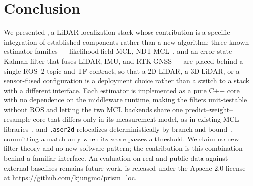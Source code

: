 \section{Conclusion}\label{sec:conclusion}

We presented \prismloc, a LiDAR localization stack whose contribution is
a specific integration of established components rather than a new
algorithm: three known estimator families --- likelihood-field MCL,
NDT-MCL~\cite{saarinen2013ndtmcl}, and an error-state Kalman filter that
fuses LiDAR, IMU, and RTK-GNSS --- are placed behind a single ROS~2
topic and TF contract, so that a 2D LiDAR, a 3D LiDAR, or a
sensor-fused configuration is a deployment choice rather than a switch
to a stack with a different interface. Each estimator is implemented as
a pure C++ core with no dependence on the middleware runtime, making the
filters unit-testable without ROS and letting the two MCL backends share
one predict--weight--resample core that differs only in its measurement
model, as in existing MCL libraries~\cite{puga2024beluga}, and
\texttt{laser2d} relocalizes deterministically by
branch-and-bound~\cite{hess2016realtime}, committing a match only when
its score passes a threshold. We claim no new filter theory and no new
software pattern; the contribution is this combination behind a
familiar interface. An evaluation on real and
public data against external baselines remains future work.
\prismloc{} is released under the Apache-2.0 license
at \url{https://github.com/kjungmo/prism_loc}.
